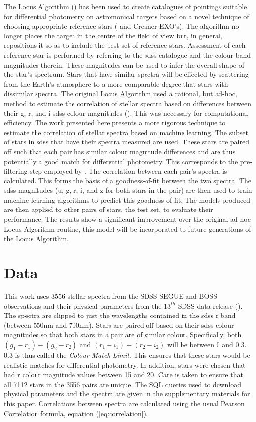 \documentclass[preprint, 3p,
authoryear]{elsarticle} %
\begin{document}
The Locus Algorithm (\citet{creaner2022}) has been used to create
catalogues of pointings suitable for differential photometry on
astromonical targets based on a novel technique of choosing appropriate
reference stars (\citet{creaner2020} and Creaner EXO's). The algorithm
no longer places the target in the centre of the field of view but, in
general, repositions it so as to include the best set of reference
stars. Assessment of each reference star is performed by referring to
the sdss catalogue and the colour band magnitudes therein. These
magnitudes can be used to infer the overall shape of the star's
spectrum. Stars that have similar spectra will be effected by scattering
from the Earth's atmosphere to a more comparable degree that stars with
dissimilar spectra. The original Locus Algorithm used a rational, but
ad-hoc, method to estimate the correlation of stellar spectra based on
differences between their g, r, and i sdss colour magnitudes
(\citet{Creaner2017}). This was necessary for computational efficiency.
The work presented here presents a more rigorous technique to estimate
the correlation of stellar spectra based on machine learning. The subset
of stars in sdss that have their spectra measured are used. These stars
are paired off such that each pair has similar colour magnitude
differences and are thus potentially a good match for differential
photometry. This corresponds to the pre-filtering step employed by
\citet{Creaner2017}. The correlation between each pair's spectra is
calculated. This forms the basis of a goodness-of-fit between the two
spectra. The sdss magnitudes (u, g, r, i, and z for both stars in the
pair) are then used to train machine learning algorithms to predict this
goodness-of-fit. The models produced are then applied to other pairs of
stars, the test set, to evaluate their performance. The results show a
significant improvement over the original ad-hoc Locus Algorithm
routine, this model will be incorporated to future generations of the
Locus Algorithm.

\hypertarget{data}{%
\section{Data}\label{data}}

This work uses 3556 stellar spectra from the SDSS SEGUE and BOSS
observations and their physical parameters from the \(13^{th}\) SDSS
data release (\citet{Aguado2018}). The spectra are clipped to just the
wavelengths contained in the sdss r band (between 550nm and 700nm).
Stars are paired off based on their sdss colour magnitudes so that both
stars in a pair are of similar colour. Specifically, both
\((g_1-r_1)-(g_2-r_2)\) and \((r_1-i_1)-(r_2-i_2)\) will be between 0
and 0.3. 0.3 is thus called the \emph{Colour Match Limit}. This ensures
that these stars would be realistic matches for differential photometry.
In addition, stars were chosen that had r colour magnitude values
between 15 and 20. Care is taken to ensure that all 7112 stars in the
3556 pairs are unique. The SQL queries used to download physical
parameters and the spectra are given in the supplementary materials for
this paper. Correlations between spectra are calculated using the usual
Pearson Correlation formula, equation (\ref{eq:correlation}).
\end{document}
